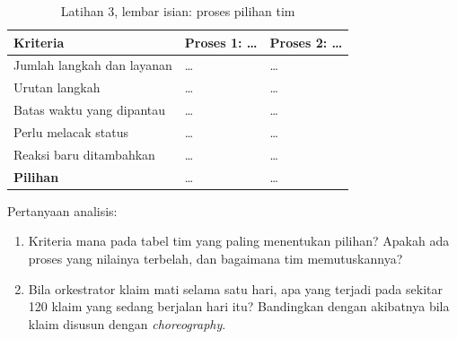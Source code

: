 \begin{table}[!htb]
  \centering
  \caption{Latihan 3, lembar isian: proses pilihan tim}
  \label{tab:ch09-lat3-hasil}
  \footnotesize
  \begin{tabularx}{\textwidth}{>{\raggedright\arraybackslash}p{3.0cm} >{\raggedright\arraybackslash}X >{\raggedright\arraybackslash}X}
    \hline
    \textbf{Kriteria} & \textbf{Proses 1: \dots} & \textbf{Proses 2: \dots} \\ \hline
    Jumlah langkah dan layanan & \dots & \dots \\ \hline
    Urutan langkah & \dots & \dots \\ \hline
    Batas waktu yang dipantau & \dots & \dots \\ \hline
    Perlu melacak status & \dots & \dots \\ \hline
    Reaksi baru ditambahkan & \dots & \dots \\ \hline
    \textbf{Pilihan} & \dots & \dots \\ \hline
  \end{tabularx}
\end{table}

Pertanyaan analisis:
\begin{enumerate}
  \item Kriteria mana pada tabel tim yang paling menentukan pilihan? Apakah ada proses yang
        nilainya terbelah, dan bagaimana tim memutuskannya?
  \item Bila orkestrator klaim mati selama satu hari, apa yang terjadi pada sekitar 120 klaim yang
        sedang berjalan hari itu? Bandingkan dengan akibatnya bila klaim disusun dengan
        \textit{choreography}.
\end{enumerate}
